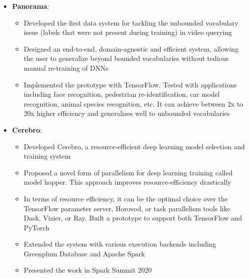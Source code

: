 \documentclass[letterpaper,11pt]{article}
\newcommand{\resumeItem}[2]{
 \item\small{
  \textbf{#1}{: #2 \vspace{-2pt}}
 }
}
\newcommand{\resumeItemListStart}{\begin{itemize}}
\newcommand{\resumeItemListEnd}{\end{itemize}\vspace{-5pt}}
\begin{document}
   \resumeItemListStart
    \resumeItem{Panorama}
     {}
     {\small
      \begin{itemize}
         \item Developed the first data system for tackling the unbounded vocabulary issue (labels that were not present during training) in video querying \vspace{-2pt}
        	 \item Designed an end-to-end, domain-agnostic and efficient system, allowing the user to generalize beyond bounded vocabularies without tedious manual re-training of DNNs \vspace{-2pt}
	     \item Implemented the prototype with TensorFlow. Tested with applications including face recognition, pedestrian re-identification, car model recognition, animal species recognition, etc. It can achieve between 2x to 20x higher efficiency and generalizes well to unbounded vocabularies \vspace{-2pt}
      \end{itemize}
     }
     \resumeItem{Cerebro}
     {}
     {\small 
     \begin{itemize}
         \item Developed Cerebro, a resource-efficient deep learning model selection and training system \vspace{-2pt}
        	 \item Proposed a novel form of parallelism for deep learning training called model hopper. This approach improves resource-efficiency drastically\vspace{-2pt}
	     \item In terms of resource efficiency, it can be the optimal choice over the TensorFlow parameter server, Horovod, or task parallelism tools like Dask, Vizier, or Ray. Built a prototype to support both TensorFlow and PyTorch \vspace{-2pt}
	     \item Extended the system with various execution backends including Greenplum Database and Apache Spark
	     \item Presented the work in Spark Summit 2020
      \end{itemize}\vspace{-5pt}
      }
   \resumeItemListEnd
\end{document}
